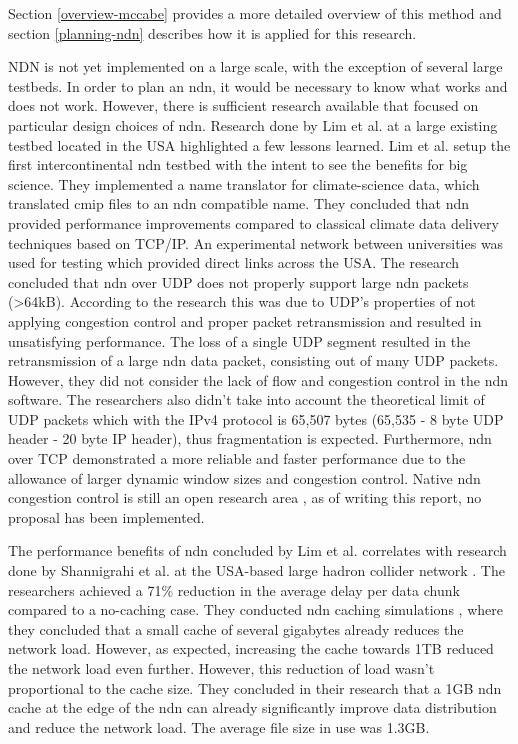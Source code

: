 
Section \ref{overview-mccabe} provides a more detailed overview of this method and section \ref{planning-ndn} describes how it is applied for this research.

NDN is not yet implemented on a large scale, with the exception of several large testbeds. In order to plan an \gls{ndn}, it would be necessary to know what works and does not work. However, there is sufficient research available that focused on particular design choices of \gls{ndn}. Research done by Lim et al. \cite{lim2018ndn} at a large existing testbed located in the USA \cite{ndn-testbed-status} highlighted a few lessons learned. Lim et al. setup the first intercontinental \gls{ndn} testbed with the intent to see the benefits for big science. They implemented a name translator for climate-science data, which translated \gls{cmip} files to an \gls{ndn} compatible name. They concluded that \gls{ndn} provided performance improvements compared to classical climate data delivery techniques based on TCP/IP. An experimental network between universities was used for testing which provided direct links across the USA. The research concluded that \gls{ndn} over UDP does not properly support large \gls{ndn} packets (\textgreater 64kB). According to the research this was due to UDP's properties of not applying congestion control and proper packet retransmission and resulted in unsatisfying performance. The loss of a single UDP segment resulted in the retransmission of a large \gls{ndn} data packet, consisting out of many UDP packets. However, they did not consider the lack of flow and congestion control in the \gls{ndn} software. The researchers also didn't take into account the theoretical limit of UDP packets which with the IPv4 protocol is 65,507 bytes (65,535 - 8 byte UDP header - 20 byte IP header), thus fragmentation is expected. Furthermore, \gls{ndn} over TCP demonstrated a more reliable and faster performance due to the allowance of larger dynamic window sizes and congestion control. Native \gls{ndn} congestion control is still an open research area \cite{ren2016congestion}, as of writing this report, no proposal has been implemented.

The performance benefits of \gls{ndn} concluded by Lim et al. correlates with research done by Shannigrahi et al. at the USA-based large hadron collider network \cite{shannigrahi2015named}. The researchers achieved a 71\% reduction in the average delay per data chunk compared to a no-caching case. They conducted \gls{ndn} caching simulations \cite{shannigrahi2017request}, where they concluded that a small cache of several gigabytes already reduces the network load. However, as expected, increasing the cache towards 1TB reduced the network load even further. However, this reduction of load wasn't proportional to the cache size. They concluded in their research that a 1GB \gls{ndn} cache at the edge of the \gls{ndn} can already significantly improve data distribution and reduce the network load. The average file size in use was 1.3GB.

